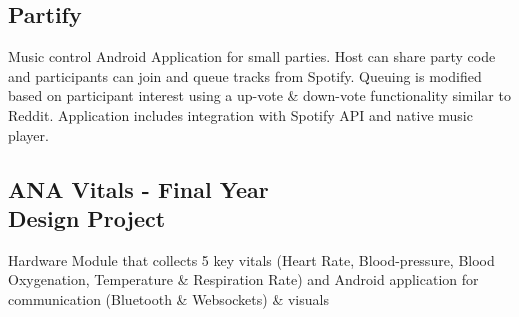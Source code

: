\documentclass[a4paper]{MagicalCV}
\begin{document}
\begin{minipage}[t]{0.33\textwidth}




\subsection{Partify}

Music control Android Application for small parties. Host can share party code and participants can join and queue tracks from Spotify. Queuing is modified based on participant interest using a up-vote \& down-vote functionality similar to Reddit. Application includes integration with Spotify API and native music player.
\sectionsep

\subsection{ANA Vitals - Final Year \\
Design Project}

Hardware Module that collects 5 key vitals (Heart Rate, Blood-pressure, Blood Oxygenation, Temperature \& Respiration Rate) and Android application for communication (Bluetooth \& Websockets) \& visuals 


\end{minipage} 
\hfill
\end{document}
